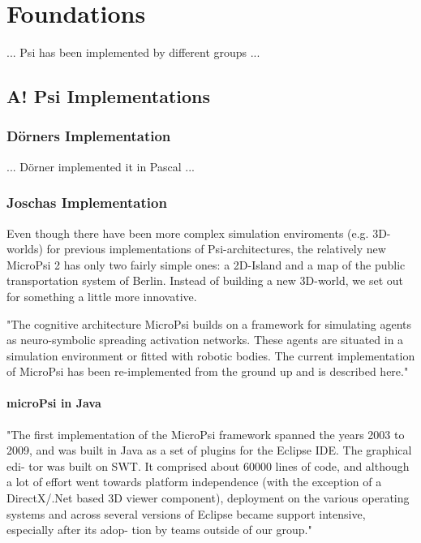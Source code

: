 \chapter{Foundations}

... Psi has been implemented by different groups ...

    \section{A! Psi Implementations}

        \subsection{Dörners Implementation}

... Dörner implemented it in Pascal ...


    \subsection{Joschas Implementation}
    
Even though there have been more complex simulation enviroments (e.g. 3D-worlds) for previous implementations of Psi-architectures, the relatively new MicroPsi 2 has only two fairly simple ones: a 2D-Island and a map of the public transportation system of Berlin. Instead of building a new 3D-world, we set out for something a little more innovative.

"The cognitive architecture MicroPsi builds on a framework for simulating agents as neuro-symbolic spreading activation networks. These agents are situated in a simulation environment or fitted with robotic bodies. The current implementation of MicroPsi has been re-implemented from the ground up and is described here."~\cite{conf/agi/Bach12}

        \subsubsection{microPsi in Java}

"The first implementation of the MicroPsi framework spanned the years 2003 to 2009, and was built in Java as a set of plugins for the Eclipse IDE. The graphical edi- tor was built on SWT. It comprised about 60000 lines of code, and although a lot of effort went towards platform independence (with the exception of a DirectX/.Net based 3D viewer component), deployment on the various operating systems and across several versions of Eclipse became support intensive, especially after its adop- tion by teams outside of our group."~\cite{conf/agi/Bach12}

